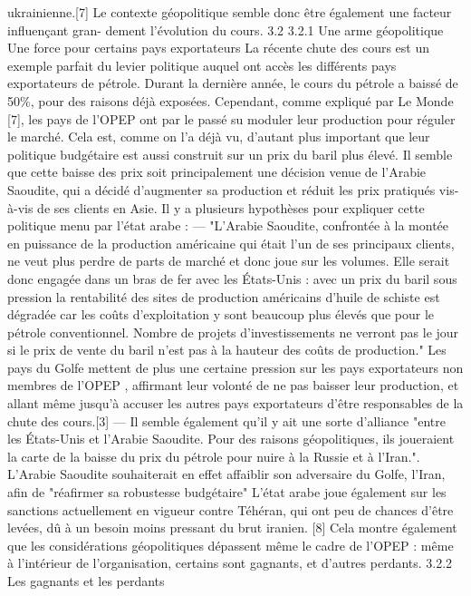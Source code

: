 ukrainienne.[7] Le contexte géopolitique semble donc être également une facteur influençant gran-
dement l’évolution du cours.
3.2
3.2.1
Une arme géopolitique
Une force pour certains pays exportateurs
La récente chute des cours est un exemple parfait du levier politique auquel ont accès les
différents pays exportateurs de pétrole.
Durant la dernière année, le cours du pétrole a baissé de 50\%, pour des raisons déjà exposées.
Cependant, comme expliqué par Le Monde [7], les pays de l’OPEP ont par le passé su moduler
leur production pour réguler le marché. Cela est, comme on l’a déjà vu, d’autant plus important
que leur politique budgétaire est aussi construit sur un prix du baril plus élevé. Il semble que
cette baisse des prix soit principalement une décision venue de l’Arabie Saoudite, qui a décidé
d’augmenter sa production et réduit les prix pratiqués vis-à-vis de ses clients en Asie.
Il y a plusieurs hypothèses pour expliquer cette politique menu par l’état arabe :
— "L’Arabie Saoudite, confrontée à la montée en puissance de la production américaine qui
était l’un de ses principaux clients, ne veut plus perdre de parts de marché et donc joue sur
les volumes. Elle serait donc engagée dans un bras de fer avec les États-Unis : avec un prix
du baril sous pression la rentabilité des sites de production américains d’huile de schiste
est dégradée car les coûts d’exploitation y sont beaucoup plus élevés que pour le pétrole
conventionnel. Nombre de projets d’investissements ne verront pas le jour si le prix de vente
du baril n’est pas à la hauteur des coûts de production." Les pays du Golfe mettent de plus
une certaine pression sur les pays exportateurs non membres de l’OPEP , affirmant leur
volonté de ne pas baisser leur production, et allant même jusqu’à accuser les autres pays
exportateurs d’être responsables de la chute des cours.[3]
— Il semble également qu’il y ait une sorte d’alliance "entre les États-Unis et l’Arabie Saoudite.
Pour des raisons géopolitiques, ils joueraient la carte de la baisse du prix du pétrole pour
nuire à la Russie et à l’Iran.". L’Arabie Saoudite souhaiterait en effet affaiblir son adversaire
du Golfe, l’Iran, afin de "réafirmer sa robustesse budgétaire" L’état arabe joue également
sur les sanctions actuellement en vigueur contre Téhéran, qui ont peu de chances d’être
levées, dû à un besoin moins pressant du brut iranien. [8]
Cela montre également que les considérations géopolitiques dépassent même le cadre de l’OPEP :
même à l’intérieur de l’organisation, certains sont gagnants, et d’autres perdants.
3.2.2
Les gagnants et les perdants
